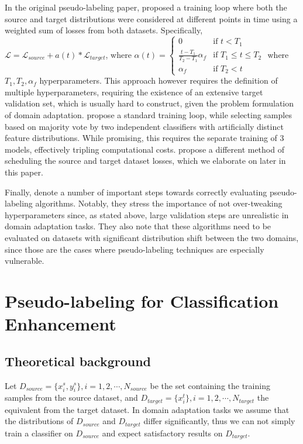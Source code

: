 \documentclass{article}
\newcommand{\loss}{\mathcal{L}}
\begin{document}
	In the original pseudo-labeling paper, \cite{pseudo-label-original} proposed a training loop where both the source and target distributions were considered at different points in time using a weighted sum of losses from both datasets. Specifically, $\loss = \loss_{source} + a(t) * \loss_{target}$, where $\alpha(t) = 
	\begin{cases} 0 & \text{if } t < T_1 \\
		\frac{t-T_1}{T_2-T_1}\alpha_f & \text{if } T_1 \leq t \leq T_2 \\
		\alpha_f & \text{if } T_2 < t
	\end{cases}$
	where $T_1, T_2, \alpha_f$ hyperparameters. This approach however requires the definition of multiple hyperparameters, requiring the existence of an extensive target validation set, which is usually hard to construct, given the problem formulation of domain adaptation. \cite{three-models} propose a standard    training loop, while selecting samples based on majority vote by two independent classifiers with artificially distinct feature distributions. While promising, this requires the separate training of 3 models, effectively tripling computational costs. \cite{ican} propose a different method of scheduling the source and target dataset losses, which we elaborate on later in this paper.
	
	Finally, \cite{pseudo-label-evaluation} denote a number of important steps towards correctly evaluating pseudo-labeling algorithms. Notably, they stress the importance of not over-tweaking hyperparameters since, as stated above, large validation steps are unrealistic in domain adaptation tasks. They also note that these algorithms need to be evaluated on datasets with significant distribution shift between the two domains, since those are the cases where pseudo-labeling techniques are especially vulnerable.
	
	
	\section{Pseudo-labeling for Classification Enhancement}
	
	\subsection{Theoretical background}
	
	
	Let $D_{source} = \{x_i^s, y_i^s\}, i=1,2,\cdots, N_{source}$ be the set containing the training samples from the source dataset, and $D_{target} = \{x_i^t\}, i=1,2,\cdots, N_{target}$ the equivalent from the target dataset. In domain adaptation tasks we assume that the distributions of $D_{source}$ and $D_{target}$ differ significantly, thus we can not simply train a classifier on $D_{source}$ and expect satisfactory results on $D_{target}$.
	
\end{document}
